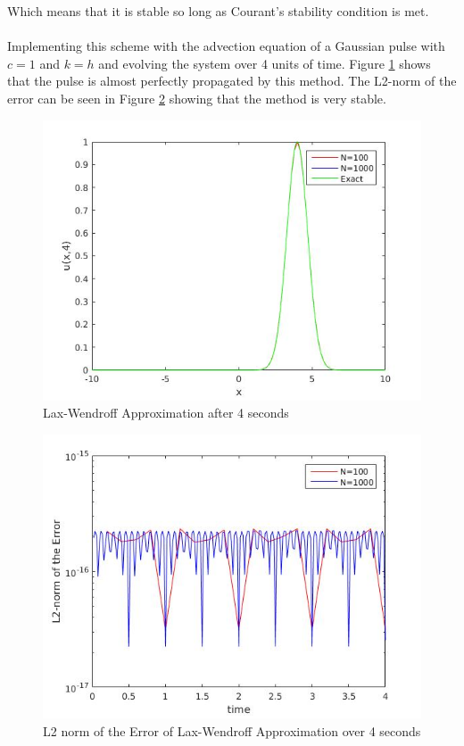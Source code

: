 Which means that it is stable so long as Courant's stability condition is met.
\\
\\
Implementing this scheme with the advection equation of a Gaussian pulse with $c=1$ and $k=h$ and evolving the system over 4 units of time. Figure \ref{laxwen_adv} shows that the pulse is almost perfectly propagated by this method. The L2-norm of the error can be seen in Figure \ref{laxwen_adv_l2} showing that the method is very stable.
\begin{figure}[H]
 \centering
 \includegraphics[scale=0.5]{Images/lw_adv_4.jpg}
 \caption{Lax-Wendroff Approximation after 4 seconds}
 \label{laxwen_adv}
\end{figure}
\begin{figure}[H]
 \centering
 \includegraphics[scale=0.5]{Images/lw_adv_4_l2.jpg}
 \caption{L2 norm of the Error of Lax-Wendroff Approximation over 4 seconds}
 \label{laxwen_adv_l2}
\end{figure}
